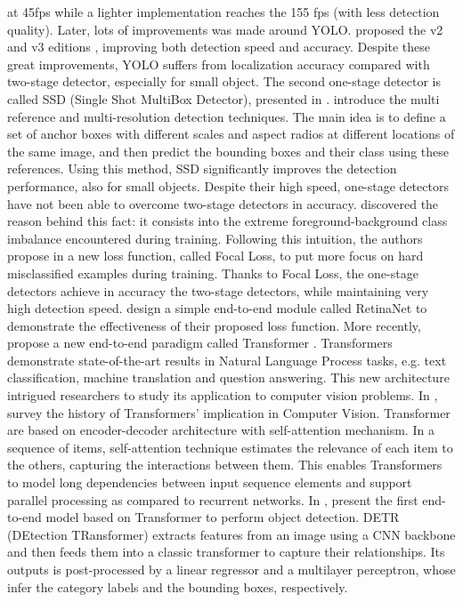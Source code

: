  at 45fps while a lighter implementation reaches the 155 fps (with less detection quality).  Later, lots of improvements was made around YOLO. \citeauthor{yolov2} proposed the v2 and v3 editions \cite{yolov2, yolov3}, improving both detection speed and accuracy. Despite these great improvements, YOLO suffers from localization accuracy compared with two-stage detector, especially for small object. The second one-stage detector is called SSD (Single Shot MultiBox Detector), presented in \cite{ssd}. \citeauthor{ssd} introduce the multi reference and multi-resolution detection techniques. The main idea is to define a set of anchor boxes with different scales and aspect radios at different locations of the same image, and then predict the bounding boxes and their class using these references. Using this method, SSD significantly improves the detection performance, also for small objects. Despite their high speed, one-stage detectors have not been able to overcome two-stage detectors in accuracy. \citeauthor{focalloss} discovered the reason behind this fact: it consists into the extreme foreground-background class imbalance encountered during training. Following this intuition, the authors propose in \cite{focalloss} a new loss function, called Focal Loss, to put more focus on hard misclassified examples during training. Thanks to Focal Loss, the one-stage detectors achieve in accuracy the two-stage detectors, while maintaining very high detection speed. \citeauthor{focalloss} design a simple end-to-end module called RetinaNet to demonstrate the effectiveness of their proposed loss function. More recently, \citeauthor{transformer} propose a new end-to-end paradigm called Transformer \cite{transformer}. Transformers demonstrate state-of-the-art results in Natural Language Process tasks, e.g. text classification, machine translation and question answering. This new architecture intrigued researchers to study its application to computer vision problems. In \cite{surveytransformer}, \citeauthor{surveytransformer} survey the history of Transformers' implication in Computer Vision. Transformer are based on encoder-decoder architecture with self-attention mechanism. In a sequence of items, self-attention technique estimates the relevance of each item to the others, capturing the interactions between them. This enables Transformers to model long dependencies between input sequence elements and support parallel processing as compared to recurrent networks. In \cite{detr}, \citeauthor{detr} present the first end-to-end model based on Transformer to perform object detection. DETR (DEtection TRansformer) extracts features from an image using a CNN backbone and then feeds them into a classic transformer to capture their relationships. Its outputs is post-processed by a linear regressor and a multilayer perceptron, whose infer the category labels and the bounding boxes, respectively.
 
